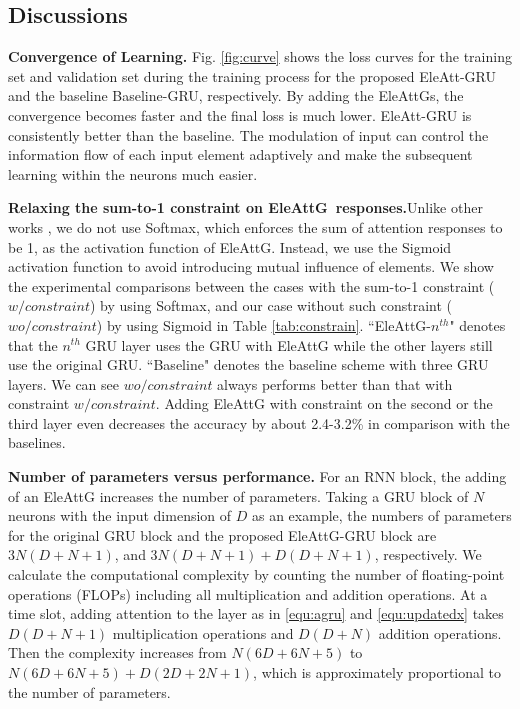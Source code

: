 \documentclass[runningheads]{llncs}
\newcommand{\EleAttGn}{{EleAttG}}
\newcommand{\EleAttG}{{EleAttG~}}
\begin{document}
\subsection{Discussions}

\textbf{Convergence of Learning.} Fig. \ref{fig:curve} shows the loss curves for the training set and validation set during the training process for the proposed EleAtt-GRU and the baseline Baseline-GRU, respectively. By adding the {\EleAttGn}s, the convergence becomes faster and the final loss is much lower. EleAtt-GRU is consistently better than the baseline. The modulation of input can control the information flow of each input element adaptively and make the subsequent learning within the neurons much easier. 







\noindent\textbf{Relaxing the sum-to-1 constraint on \EleAttG responses.}Unlike other works \cite{xu2015show,song2017end,liu2017global}, we do not use Softmax, which enforces the sum of attention responses to be 1, as the activation function of EleAttG. Instead, we use the Sigmoid activation function to avoid introducing  mutual influence of elements. We show the experimental comparisons between the cases with the sum-to-1 constraint ($w/ constraint$) by using Softmax, and our case without such constraint ($wo/ constraint$) by using Sigmoid in Table \ref{tab:constrain}. ``EleAttG-$n^{th}$" denotes that the $n^{th}$ GRU layer uses the GRU with EleAttG while the other layers still use the original GRU. ``Baseline" denotes the baseline scheme with three GRU layers. We can see $wo/ constraint$ always performs better than that with constraint $w/ constraint$. Adding EleAttG with constraint on the second or the third layer even decreases the accuracy by about 2.4-3.2\% in comparison with the baselines. 

\noindent\textbf{Number of parameters versus performance.} For an RNN block, the adding of an EleAttG increases the number of parameters. Taking a GRU block of $N$ neurons with the input dimension of $D$ as an example, the numbers of parameters for the original GRU block and the proposed EleAttG-GRU block are $3N(D+N+1)$, and $3N(D+N+1) +D(D+N+1)$, respectively. We calculate the computational complexity by counting the number of floating-point operations (FLOPs) including all multiplication and addition operations. At a time slot, adding attention to the layer as in \ref{equ:agru} and \ref{equ:updatedx} takes $D(D+N+1)$ multiplication operations and $D(D+N)$ addition operations. Then the complexity increases from $N(6D+6N+5)$ to $N(6D+6N+5)+D(2D+2N+1)$, which is approximately proportional to the number of parameters. 
\end{document}
